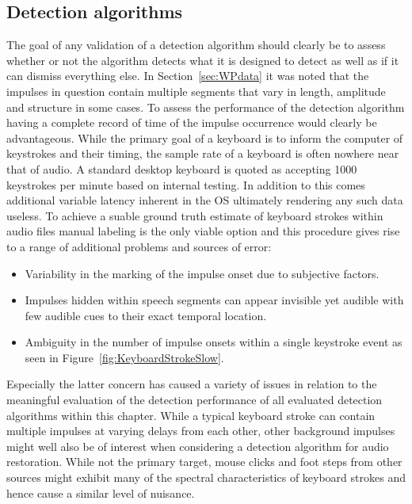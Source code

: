 \subsection{Detection algorithms}
The goal of any validation of a detection algorithm should clearly be to assess whether or not the algorithm detects what it is designed to detect as well as if it can dismiss everything else. In Section~\ref{sec:WPdata} it was noted that the impulses in question contain multiple segments that vary in length, amplitude and structure in some cases. To assess the performance of the detection algorithm having a complete record of time of the impulse occurrence would clearly be advantageous. While the primary goal of a keyboard is to inform the computer of keystrokes and their timing, the sample rate of a keyboard is often nowhere near that of audio. A standard desktop keyboard is quoted as accepting 1000 keystrokes per minute based on internal testing\cite{MSCurveKeyboard3000}. In addition to this comes additional variable latency inherent in the OS ultimately rendering any such data useless. To achieve a suable ground truth estimate of keyboard strokes within audio files manual labeling is the only viable option and this procedure gives rise to a range of additional problems and sources of error:

\begin{itemize}
  \item Variability in the marking of the impulse onset due to subjective factors.
  \item Impulses hidden within speech segments can appear invisible yet audible with few audible cues to their exact temporal location.
  \item Ambiguity in the number of impulse onsets within a single keystroke event as seen in Figure~\ref{fig:KeyboardStrokeSlow}.
\end{itemize}

Especially the latter concern has caused a variety of issues in relation to the meaningful evaluation of the detection performance of all evaluated detection algorithms within this chapter. While a typical keyboard stroke can contain multiple impulses at varying delays from each other, other background impulses might well also be of interest when considering a detection algorithm for audio restoration. While not the primary target, mouse clicks and foot steps from other sources might exhibit many of the spectral characteristics of keyboard strokes and hence cause a similar level of nuisance.

